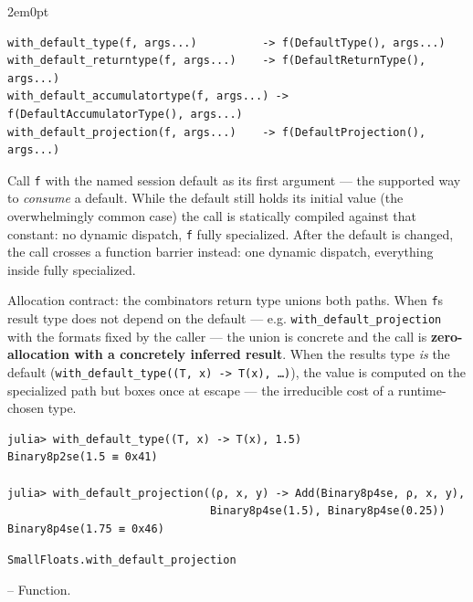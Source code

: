 \begin{adjustwidth}{2em}{0pt}


\begin{verbatim}
with_default_type(f, args...)          -> f(DefaultType(), args...)
with_default_returntype(f, args...)    -> f(DefaultReturnType(), args...)
with_default_accumulatortype(f, args...) -> f(DefaultAccumulatorType(), args...)
with_default_projection(f, args...)    -> f(DefaultProjection(), args...)
\end{verbatim}

Call \texttt{f} with the named session default as its first argument — the supported way to \emph{consume} a default. While the default still holds its initial value (the overwhelmingly common case) the call is statically compiled against that constant: no dynamic dispatch, \texttt{f} fully specialized. After the default is changed, the call crosses a function barrier instead: one dynamic dispatch, everything inside fully specialized.

Allocation contract: the combinator{\textquotesingle}s return type unions both paths. When \texttt{f}{\textquotesingle}s result type does not depend on the default — e.g. \texttt{with\_default\_projection} with the formats fixed by the caller — the union is concrete and the call is \textbf{zero-allocation with a concretely inferred result}. When the result{\textquotesingle}s type \emph{is} the default (\texttt{with\_default\_type((T, x) -> T(x), …)}), the value is computed on the specialized path but boxes once at escape — the irreducible cost of a runtime-chosen type.


\begin{verbatim}
julia> with_default_type((T, x) -> T(x), 1.5)
Binary8p2se(1.5 ≡ 0x41)

julia> with_default_projection((ρ, x, y) -> Add(Binary8p4se, ρ, x, y),
                               Binary8p4se(1.5), Binary8p4se(0.25))
Binary8p4se(1.75 ≡ 0x46)
\end{verbatim}



\end{adjustwidth}
\hypertarget{16240126272133078948}{\texttt{SmallFloats.with\_default\_projection}}  -- {Function.}

